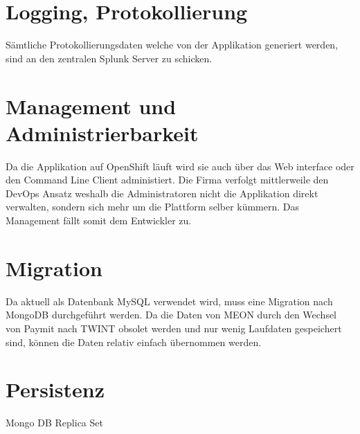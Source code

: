 \section{Logging, Protokollierung}

Sämtliche Protokollierungsdaten welche von der Applikation generiert werden, sind an den zentralen Splunk Server zu schicken.

\section{Management und Administrierbarkeit}

Da die Applikation auf OpenShift läuft wird sie auch über das Web interface oder den Command Line Client administiert. Die Firma verfolgt mittlerweile den DevOps Ansatz weshalb die Administratoren nicht die Applikation direkt verwalten, sondern sich mehr um die Plattform selber kümmern.  Das Management fällt somit dem Entwickler zu. 

\section{Migration}

Da aktuell als Datenbank MySQL verwendet wird, muss eine Migration nach MongoDB durchgeführt werden. Da die Daten von MEON durch den Wechsel von Paymit nach TWINT
obsolet werden und nur wenig Laufdaten gespeichert sind, können die Daten relativ einfach übernommen werden.

\section{Persistenz}
\label{persistenz}

Mongo DB
Replica Set

